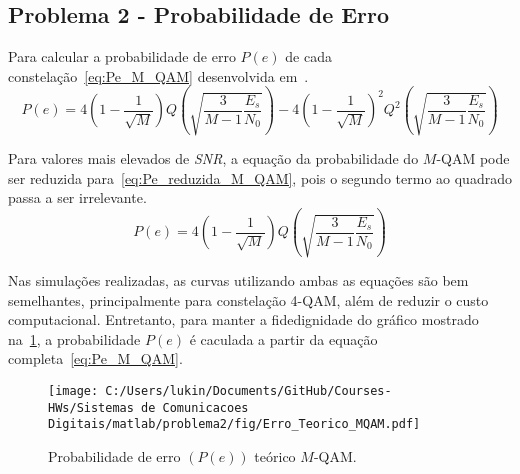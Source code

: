 \subsection{Problema 2 - Probabilidade de Erro}
Para calcular a probabilidade de erro $P(e)$ de cada constelação~\ref{eq:Pe_M_QAM} desenvolvida em~\cite{Cecilio}.
\begin{equation}
    P(e) = 4 \left(1-\frac{1}{\sqrt{M}}\right) Q\left(\sqrt{\frac{3}{M-1}\frac{E_s}{N_0}}\right) - 4\left(1-\frac{1}{\sqrt{M}}\right)^2 Q^2\left(\sqrt{\frac{3}{M-1}\frac{E_s}{N_0}}\right)
    \label{eq:Pe_M_QAM}
\end{equation}

Para valores mais elevados de \textit{SNR}, a equação da probabilidade do $M$-QAM pode ser reduzida para~\ref{eq:Pe_reduzida_M_QAM}, pois o segundo termo ao quadrado passa a ser irrelevante.
\begin{equation}
    P(e) = 4 \left(1-\frac{1}{\sqrt{M}}\right) Q\left(\sqrt{\frac{3}{M-1}\frac{E_s}{N_0}}\right)
    \label{eq:Pe_reduzida_M_QAM}
\end{equation}

Nas simulações realizadas, as curvas utilizando ambas as equações são bem semelhantes, principalmente para constelação 4-QAM, além de reduzir o custo computacional. Entretanto, para manter a fidedignidade do gráfico mostrado na~\ref{fig:Erro_Teorico_MQAM}, a probabilidade $P(e)$ é caculada a partir da equação completa~\ref{eq:Pe_M_QAM}.

\begin{figure}[!ht]
    \centering
    \texttt{[image: C:/Users/lukin/Documents/GitHub/Courses-HWs/Sistemas de Comunicacoes Digitais/matlab/problema2/fig/Erro\_Teorico\_MQAM.pdf]}
    \caption{Probabilidade de erro $(P(e))$ teórico $M$-QAM.}
    \label{fig:Erro_Teorico_MQAM}
\end{figure}